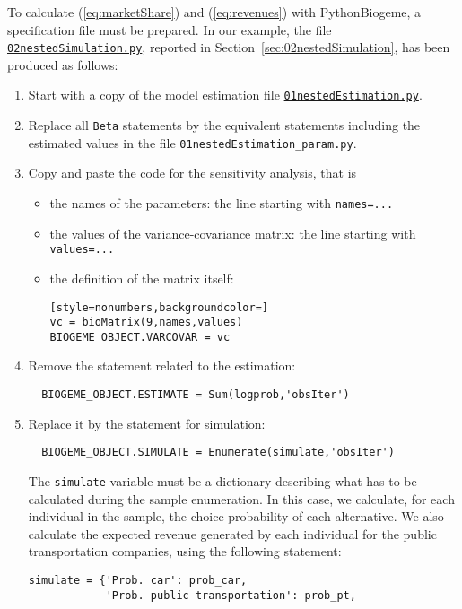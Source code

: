 \documentclass[12pt,a4paper]{article}
\newcommand{\req}[1]{(\ref{#1})}
\begin{document}
To calculate \req{eq:marketShare} and \req{eq:revenues} with
PythonBiogeme, a specification file must be prepared. In our example,
the file \href{http://biogeme.epfl.ch/examples/indicators/python/02nestedSimulation.py}{\lstinline$02nestedSimulation.py$},
reported in Section~\ref{sec:02nestedSimulation}, has been produced
as follows:
\begin{enumerate}
\item Start with a copy of the model estimation file \href{http://biogeme.epfl.ch/examples/indicators/python/01nestedEstimation.py}{\lstinline$01nestedEstimation.py$}.
\item Replace all \lstinline$Beta$ statements by the equivalent
  statements including the estimated values in the file \lstinline$01nestedEstimation_param.py$.
\item Copy and paste the code for the sensitivity analysis, that is
  \begin{itemize}
  \item the names of the parameters: the line starting with \lstinline$names=...$
  \item the values of the variance-covariance matrix:
    the line starting with \lstinline$values=...$
  \item the definition of the matrix itself:
\begin{lstlisting}[style=nonumbers,backgroundcolor=]
vc = bioMatrix(9,names,values)
BIOGEME OBJECT.VARCOVAR = vc
\end{lstlisting}
  \end{itemize}
\item Remove the statement related to the estimation:
\begin{lstlisting}
  BIOGEME_OBJECT.ESTIMATE = Sum(logprob,'obsIter')
\end{lstlisting}
\item Replace it by the statement for simulation:
\begin{lstlisting}
  BIOGEME_OBJECT.SIMULATE = Enumerate(simulate,'obsIter')
\end{lstlisting}
The \lstinline$simulate$ variable must be a dictionary describing what
has to be calculated during the sample enumeration. In this case, we
calculate, for each individual in the sample, the choice probability
of each alternative. We also calculate the expected revenue generated
by each individual for the public transportation companies, using the following statement:
\begin{lstlisting}
simulate = {'Prob. car': prob_car,
            'Prob. public transportation': prob_pt,

\end{lstlisting}
\end{enumerate}
\end{document}
